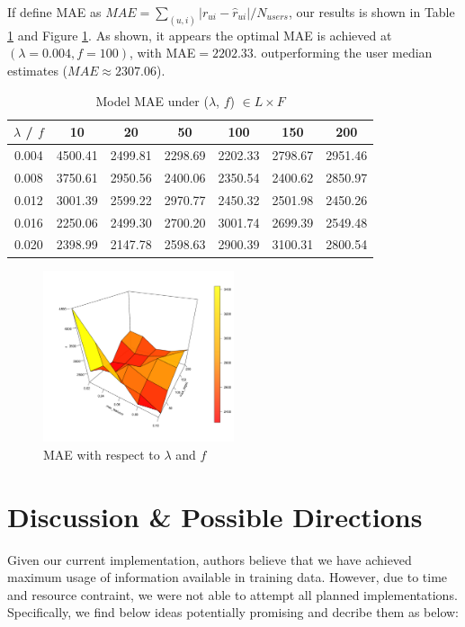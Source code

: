 \documentclass[11pt]{article}
\theoremstyle{definition}
\begin{document}
If define MAE as $MAE = \sum_{(u, i)} |r_{ui} - \hat{r}_{ui}|/N_{users}$, our results is shown in Table \ref{tb:MAE} and Figure \ref{fig:MAE}. As shown, it appears the optimal MAE is achieved at $(\lambda = 0.004, f = 100)$, with MAE$ = 2202.33$. outperforming the user median estimates ($MAE \approx 2307.06$).

\begin{table}[ht]
\centering
\begin{tabular}{ccccccc}
  \hline
$\lambda$ / $f$ & 10 & 20 & 50 & 100 & 150 & 200 \\ 
  \hline
0.004 & 4500.41 & 2499.81 & 2298.69 & 2202.33 & 2798.67 & 2951.46 \\ 
  0.008 & 3750.61 & 2950.56 & 2400.06 & 2350.54 & 2400.62 & 2850.97 \\ 
  0.012 & 3001.39 & 2599.22 & 2970.77 & 2450.32 & 2501.98 & 2450.26 \\ 
  0.016 & 2250.06 & 2499.30 & 2700.20 & 3001.74 & 2699.39 & 2549.48 \\ 
  0.020 & 2398.99 & 2147.78 & 2598.63 & 2900.39 & 3100.31 & 2800.54 \\ 
   \hline
\end{tabular}
\caption{Model MAE under ($\lambda$, $f$) $\in L \times F$}
\label{tb:MAE}
\end{table}

\begin{figure}[!h]
        \centering
        \includegraphics[width=0.5\textwidth]{"./plots/parameter"}
        \caption{MAE with respect to $\lambda$ and $f$}
        \label{fig:MAE}
\end{figure}


\newpage
\section{\textbf{Discussion \& Possible Directions}}

Given our current implementation, authors believe that we have achieved maximum usage of information available in training data. However, due to time and resource contraint, we were not able to attempt all planned implementations. Specifically, we find below ideas potentially promising and decribe them as below:
\end{document}

